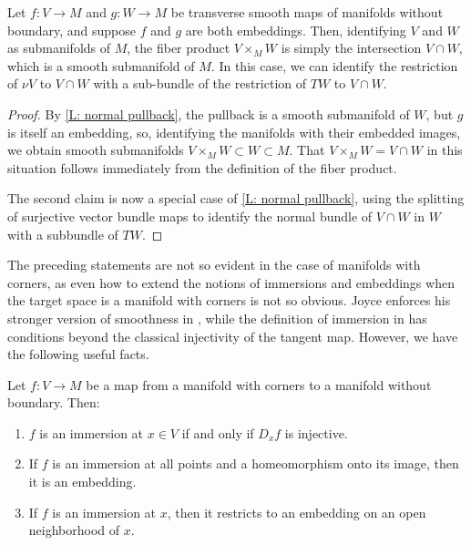 \begin{lemma}\label{L: fiber product of embeddings}
	Let $f \colon V \to M$ and $g \colon W \to M$ be transverse smooth maps of manifolds without boundary, and suppose $f$ and $g$ are both embeddings.
	Then, identifying $V$ and $W$ as submanifolds of $M$, the fiber product $V \times_MW$ is simply the intersection $V \cap W$, which is a smooth submanifold of $M$.
	In this case, we can identify the restriction of $\nu V$ to $V \cap W$ with a sub-bundle of the restriction of $TW$ to $V \cap W$.
\end{lemma}

\begin{proof}
	By \cref{L: normal pullback}, the pullback is a smooth submanifold of $W$, but $g$ is itself an embedding, so, identifying the manifolds with their embedded images, we obtain smooth submanifolds $V \times_MW \subset W \subset M$.
	That $V \times_MW = V \cap W$ in this situation follows immediately from the definition of the fiber product.

	The second claim is now a special case of \cref{L: normal pullback}, using the splitting of surjective vector bundle maps \cite[Theorem 3.9.6]{Hus75} to identify the normal bundle of $V \cap W$ in $W$ with a subbundle of $TW$.
\end{proof}

The preceding statements are not so evident in the case of manifolds with corners, as even how to extend the notions of immersions and embeddings when the target space is a manifold with corners is not so obvious. Joyce enforces his stronger version of smoothness in \cite{Joy12}, while the definition of immersion in \cite[Section 3.2]{MaDo92} has conditions beyond the classical injectivity of the tangent map. However, we have the following useful facts.

\begin{lemma}\label{L: immersions}
	Let $f \colon V \to M$ be a map from a manifold with corners to a manifold without boundary.
	Then:
	\begin{enumerate}
		\item $f$ is an immersion at $x \in V$ if and only if $D_xf$ is injective.
		\item If $f$ is an immersion at all points and a homeomorphism onto its image, then it is an embedding.
		\item If $f$ is an immersion at $x$, then it restricts to an embedding on an open neighborhood of $x$.
	\end{enumerate}
\end{lemma}

